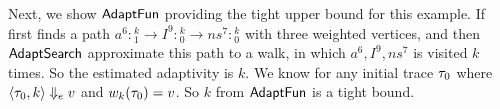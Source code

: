 \begin{example}
{
Next, we show {$\textsf{AdaptFun}$} providing the tight upper bound for this example.
If first finds a path  
$a^{6}: {}^k_1 \to I^9:{}^k_0 \to ns^7:{}^k_0$ with three weighted vertices, and then $\mathsf{AdaptSearch}$ approximate this path to a walk, in which $a^6,I^9, ns^{7}$ is visited $k$ times. So the estimated adaptivity is $k$. We know for any initial trace $\mathtt{\tau}_0$ where $\langle \mathtt{\tau}_0, k \rangle \Downarrow_e v$ and 
$w_k(\mathtt{\tau}_0) = v$. So $k$ from {$\textsf{AdaptFun}$} is a tight bound.
}
\end{example}
